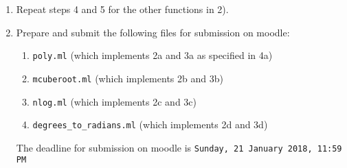 \documentclass{article}
\begin{document}
\begin{enumerate}
\item Repeat steps 4 and 5 for the other functions in 2).

\item Prepare and submit the following files for submission on moodle:

	\begin{enumerate}
		\item {\tt poly.ml} (which implements 2a and 3a as specified in 4a)
		\item {\tt mcuberoot.ml} (which implements 2b and 3b)
		\item {\tt nlog.ml} (which implements 2c and 3c)
		\item {\tt degrees\_to\_radians.ml} (which implements 2d and 3d)
	\end{enumerate}
	The deadline for submission on moodle is {\tt Sunday, 21 January 2018, 11:59 PM}

\end{enumerate}
\end{document}
